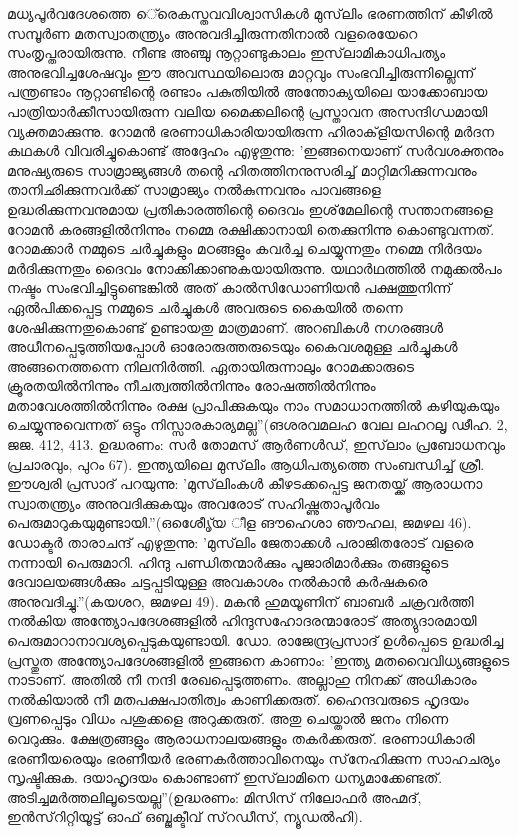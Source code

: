 മധ്യപൂര്‍വദേശത്തെ െ്രെകസ്തവവിശ്വാസികള്‍ മുസ്‌ലിം ഭരണത്തിന് കീഴില്‍ സമ്പൂര്‍ണ മതസ്വാതന്ത്യ്രം അനുവദിച്ചിരുന്നതിനാല്‍ വളരെയേറെ സംതൃപ്തരായിരുന്നു. നീണ്ട അഞ്ചു നൂറ്റാണ്ടുകാലം ഇസ്‌ലാമികാധിപത്യം അനുഭവിച്ചശേഷവും ഈ അവസ്ഥയിലൊരു മാറ്റവും സംഭവിച്ചിരുന്നില്ലെന്ന് പന്ത്രണ്ടാം നൂറ്റാണ്ടിന്റെ രണ്ടാം പകുതിയില്‍ അന്തോക്യയിലെ യാക്കോബായ പാത്രിയാര്‍ക്കീസായിരുന്ന വലിയ മൈക്കലിന്റെ പ്രസ്താവന അസന്ദിഗ്ധമായി വ്യക്തമാക്കുന്നു. റോമന്‍ ഭരണാധികാരിയായിരുന്ന ഹിരാക്‌ളിയസിന്റെ മര്‍ദന കഥകള്‍ വിവരിച്ചുകൊണ്ട് അദ്ദേഹം എഴുതുന്നു: 'ഇങ്ങനെയാണ് സര്‍വശക്തനും മനുഷ്യരുടെ സാമ്രാജ്യങ്ങള്‍ തന്റെ ഹിതത്തിനനുസരിച്ച് മാറ്റിമറിക്കുന്നവനും താനിഛിക്കുന്നവര്‍ക്ക് സാമ്രാജ്യം നല്‍കുന്നവനും പാവങ്ങളെ ഉദ്ധരിക്കുന്നവനുമായ പ്രതികാരത്തിന്റെ ദൈവം ഇശ്‌മേലിന്റെ സന്താനങ്ങളെ റോമന്‍ കരങ്ങളില്‍നിന്നും നമ്മെ രക്ഷിക്കാനായി തെക്കുനിന്നു കൊണ്ടുവന്നത്. റോമക്കാര്‍ നമ്മുടെ ചര്‍ച്ചുകളും മഠങ്ങളും കവര്‍ച്ച ചെയ്യുന്നതും നമ്മെ നിര്‍ദയം മര്‍ദിക്കുന്നതും ദൈവം നോക്കിക്കാണുകയായിരുന്നു. യഥാര്‍ഥത്തില്‍ നമുക്കല്‍പം നഷ്ടം സംഭവിച്ചിട്ടുണ്ടെങ്കില്‍ അത് കാല്‍സിഡോണിയന്‍ പക്ഷത്തുനിന്ന് ഏല്‍പിക്കപ്പെട്ട നമ്മുടെ ചര്‍ച്ചുകള്‍ അവരുടെ കൈയില്‍ തന്നെ ശേഷിക്കുന്നതുകൊണ്ട് ഉണ്ടായതു മാത്രമാണ്. അറബികള്‍ നഗരങ്ങള്‍ അധീനപ്പെടുത്തിയപ്പോള്‍ ഓരോരുത്തരുടെയും കൈവശമുള്ള ചര്‍ച്ചുകള്‍ അങ്ങനെത്തന്നെ നിലനിര്‍ത്തി. ഏതായിരുന്നാലും റോമക്കാരുടെ ക്രൂരതയില്‍നിന്നും നീചത്വത്തില്‍നിന്നും രോഷത്തില്‍നിന്നും മതാവേശത്തില്‍നിന്നും രക്ഷ പ്രാപിക്കുകയും നാം സമാധാനത്തില്‍ കഴിയുകയും ചെയ്യുന്നുവെന്നത് ഒട്ടും നിസ്സാരകാര്യമല്ല''(ങശരവമലഹ വേല ലഹറലൃ ഢീഹ. 2, ജജ. 412, 413. ഉദ്ധരണം: സര്‍ തോമസ് ആര്‍ണള്‍ഡ്, ഇസ്‌ലാം പ്രബോധനവും പ്രചാരവും, പുറം 67).
ഇന്ത്യയിലെ മുസ്‌ലിം ആധിപത്യത്തെ സംബന്ധിച്ച് ശ്രീ. ഈശ്വരി പ്രസാദ് പറയുന്നു: 'മുസ്‌ലിംകള്‍ കീഴടക്കപ്പെട്ട ജനതയ്ക്ക് ആരാധനാ സ്വാതന്ത്യ്രം അനുവദിക്കുകയും അവരോട് സഹിഷ്ണുതാപൂര്‍വം പെരുമാറുകയുമുണ്ടായി.''(ഒശേെീൃ്യ ീള ങൗഹെശാ ഞൗഹല, ജമഴല 46).
ഡോക്ടര്‍ താരാചന്ദ് എഴുതുന്നു: 'മുസ്‌ലിം ജേതാക്കള്‍ പരാജിതരോട് വളരെ നന്നായി പെരുമാറി. ഹിന്ദു പണ്ഡിതന്മാര്‍ക്കും പൂജാരിമാര്‍ക്കും തങ്ങളുടെ ദേവാലയങ്ങള്‍ക്കും ചട്ടപ്പടിയുള്ള അവകാശം നല്‍കാന്‍ കര്‍ഷകരെ അനുവദിച്ചു.''(കയശറ, ജമഴല 49).
മകന്‍ ഹുമയൂണിന് ബാബര്‍ ചക്രവര്‍ത്തി നല്‍കിയ അന്ത്യോപദേശങ്ങളില്‍ ഹിന്ദുസഹോദരന്മാരോട് അത്യുദാരമായി പെരുമാറാനാവശ്യപ്പെടുകയുണ്ടായി. ഡോ. രാജേന്ദ്രപ്രസാദ് ഉള്‍പ്പെടെ ഉദ്ധരിച്ച പ്രസ്തുത അന്ത്യോപദേശങ്ങളില്‍ ഇങ്ങനെ കാണാം: 'ഇന്ത്യ മതവൈവിധ്യങ്ങളുടെ നാടാണ്. അതില്‍ നീ നന്ദി രേഖപ്പെടുത്തണം. അല്ലാഹു നിനക്ക് അധികാരം നല്‍കിയാല്‍ നീ മതപക്ഷപാതിത്വം കാണിക്കരുത്. ഹൈന്ദവരുടെ ഹൃദയം വ്രണപ്പെടും വിധം പശുക്കളെ അറുക്കരുത്. അതു ചെയ്താല്‍ ജനം നിന്നെ വെറുക്കും. ക്ഷേത്രങ്ങളും ആരാധനാലയങ്ങളും തകര്‍ക്കരുത്. ഭരണാധികാരി ഭരണീയരെയും ഭരണീയര്‍ ഭരണകര്‍ത്താവിനെയും സ്‌നേഹിക്കുന്ന സാഹചര്യം സൃഷ്ടിക്കുക. ദയാഹൃദയം കൊണ്ടാണ് ഇസ്‌ലാമിനെ ധന്യമാക്കേണ്ടത്. അടിച്ചമര്‍ത്തലിലൂടെയല്ല''(ഉദ്ധരണം: മിസിസ് നിലോഫര്‍ അഹ്മദ്, ഇന്‍സ്‌റിറ്റിയൂട്ട് ഓഫ് ഒബ്ജക്ടീവ് സ്‌റഡീസ്, ന്യൂഡല്‍ഹി).
